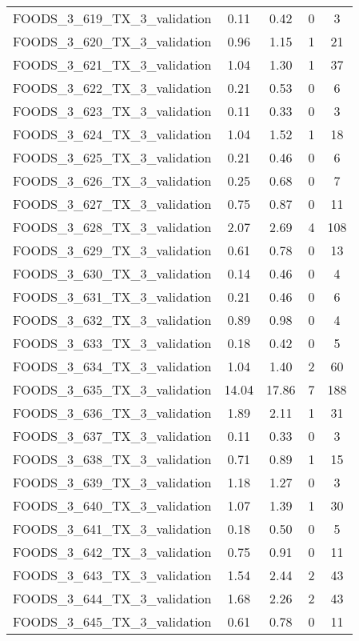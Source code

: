 \begin{table}
\begin{tabular}{|l|c|c|c|c|}
FOODS\_3\_619\_TX\_3\_validation & 0.11 & 0.42 & 0 & 3 \\
FOODS\_3\_620\_TX\_3\_validation & 0.96 & 1.15 & 1 & 21 \\
FOODS\_3\_621\_TX\_3\_validation & 1.04 & 1.30 & 1 & 37 \\
FOODS\_3\_622\_TX\_3\_validation & 0.21 & 0.53 & 0 & 6 \\
FOODS\_3\_623\_TX\_3\_validation & 0.11 & 0.33 & 0 & 3 \\
FOODS\_3\_624\_TX\_3\_validation & 1.04 & 1.52 & 1 & 18 \\
FOODS\_3\_625\_TX\_3\_validation & 0.21 & 0.46 & 0 & 6 \\
FOODS\_3\_626\_TX\_3\_validation & 0.25 & 0.68 & 0 & 7 \\
FOODS\_3\_627\_TX\_3\_validation & 0.75 & 0.87 & 0 & 11 \\
FOODS\_3\_628\_TX\_3\_validation & 2.07 & 2.69 & 4 & 108 \\
FOODS\_3\_629\_TX\_3\_validation & 0.61 & 0.78 & 0 & 13 \\
FOODS\_3\_630\_TX\_3\_validation & 0.14 & 0.46 & 0 & 4 \\
FOODS\_3\_631\_TX\_3\_validation & 0.21 & 0.46 & 0 & 6 \\
FOODS\_3\_632\_TX\_3\_validation & 0.89 & 0.98 & 0 & 4 \\
FOODS\_3\_633\_TX\_3\_validation & 0.18 & 0.42 & 0 & 5 \\
FOODS\_3\_634\_TX\_3\_validation & 1.04 & 1.40 & 2 & 60 \\
FOODS\_3\_635\_TX\_3\_validation & 14.04 & 17.86 & 7 & 188 \\
FOODS\_3\_636\_TX\_3\_validation & 1.89 & 2.11 & 1 & 31 \\
FOODS\_3\_637\_TX\_3\_validation & 0.11 & 0.33 & 0 & 3 \\
FOODS\_3\_638\_TX\_3\_validation & 0.71 & 0.89 & 1 & 15 \\
FOODS\_3\_639\_TX\_3\_validation & 1.18 & 1.27 & 0 & 3 \\
FOODS\_3\_640\_TX\_3\_validation & 1.07 & 1.39 & 1 & 30 \\
FOODS\_3\_641\_TX\_3\_validation & 0.18 & 0.50 & 0 & 5 \\
FOODS\_3\_642\_TX\_3\_validation & 0.75 & 0.91 & 0 & 11 \\
FOODS\_3\_643\_TX\_3\_validation & 1.54 & 2.44 & 2 & 43 \\
FOODS\_3\_644\_TX\_3\_validation & 1.68 & 2.26 & 2 & 43 \\
FOODS\_3\_645\_TX\_3\_validation & 0.61 & 0.78 & 0 & 11 \\

\end{tabular}
\end{table}
